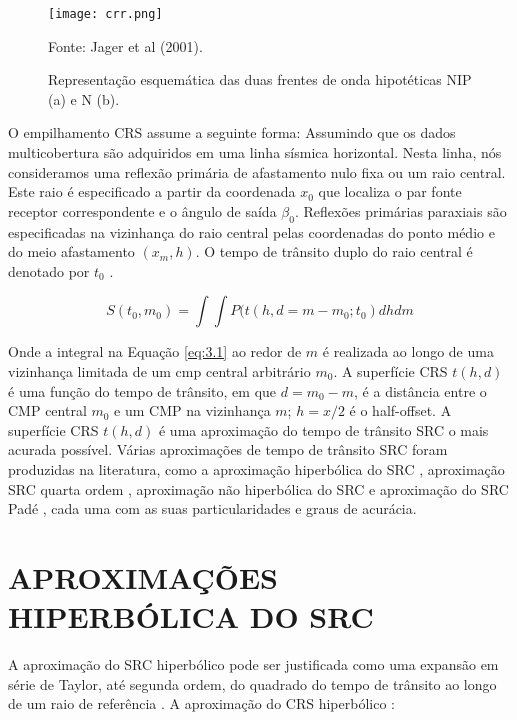 \begin{figure}[htb]
\caption{Representação esquemática das duas frentes de onda hipotéticas NIP (a) e N (b).}
\begin{center}
\texttt{[image: crr.png]}
\vspace{-0.3cm}
\end{center}
\begin{center}
 Fonte: Jager et al (2001).
\end{center}
\label{fig:3.1}
\end{figure}

O empilhamento CRS assume a seguinte forma:
Assumindo que os dados multicobertura são adquiridos em uma linha sísmica horizontal. Nesta linha, nós consideramos
uma reflexão primária de afastamento nulo fixa ou um raio central. Este raio é especificado a partir da coordenada $x_0$
que localiza o par fonte receptor correspondente e o ângulo de saída $\beta_0$. Reflexões primárias 
paraxiais são especificadas na vizinhança do raio central pelas coordenadas do ponto médio e do meio afastamento $(x_m,h)$.
O tempo de trânsito duplo do raio central é denotado por $t_0$ \cite{chirajc}.


\begin{equation}
\label{eq:3.1}
 S(t_0,m_0)=\int\int P(t(h,d=m-m_0;t_0)dhdm
\end{equation}


Onde a integral na Equação \ref{eq:3.1} ao redor de $m$ é realizada ao longo de uma vizinhança limitada de
um cmp central arbitrário $m_0$.
A superfície CRS $t(h,d)$ é uma função do
tempo de trânsito, em que $d=m_0-m$, é a distância entre o CMP central $m_0$ e um CMP na vizinhança $m$;
$h=x/2$ é o half-offset.
A superfície CRS $t(h,d)$ é uma aproximação do tempo de trânsito SRC o mais acurada possível. Várias
aproximações de tempo de trânsito SRC foram produzidas na literatura, como a aproximação hiperbólica do SRC
\cite{jager}, aproximação SRC quarta ordem \cite{germam}, aproximação não hiperbólica do SRC \cite{fomel1}
e aproximação do SRC Padé \cite{neves}, cada uma com as suas particularidades e graus de acurácia.

\section{APROXIMAÇÕES HIPERBÓLICA DO SRC}

A aproximação do SRC hiperbólico pode ser justificada como
uma expansão em série de Taylor, até segunda ordem, do quadrado do tempo de trânsito 
ao longo de um raio de referência \cite{fomel1}. A aproximação do CRS hiperbólico \cite{jager}:

